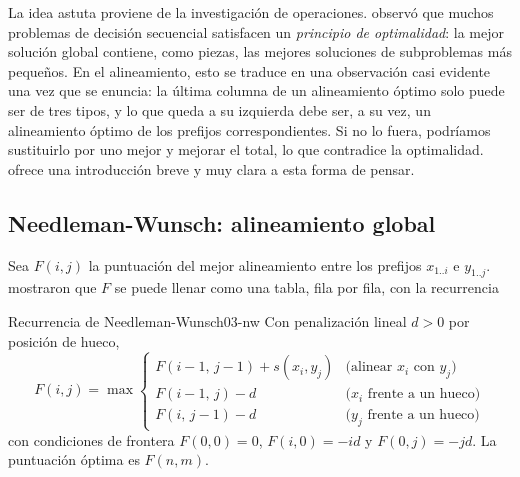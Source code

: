 La idea astuta proviene de la investigación de operaciones. \textcite{c03-bellman1954} observó que muchos problemas de decisión secuencial satisfacen un \emph{principio de optimalidad}: la mejor solución global contiene, como piezas, las mejores soluciones de subproblemas más pequeños. En el alineamiento, esto se traduce en una observación casi evidente una vez que se enuncia: la última columna de un alineamiento óptimo solo puede ser de tres tipos, y lo que queda a su izquierda debe ser, a su vez, un alineamiento óptimo de los prefijos correspondientes. Si no lo fuera, podríamos sustituirlo por uno mejor y mejorar el total, lo que contradice la optimalidad. \textcite{c03-eddy2004dp} ofrece una introducción breve y muy clara a esta forma de pensar.

\subsection{Needleman-Wunsch: alineamiento global}

Sea $F(i,j)$ la puntuación del mejor alineamiento entre los prefijos $x_{1..i}$ e $y_{1..j}$. \textcite{c03-needleman1970} mostraron que $F$ se puede llenar como una tabla, fila por fila, con la recurrencia

\begin{teorema}{Recurrencia de Needleman-Wunsch}{03-nw}
Con penalización lineal $d>0$ por posición de hueco,
\begin{equation}\label{eq:03-nw}
F(i,j) = \max\begin{cases}
F(i-1,\,j-1) + s(x_i, y_j) & \text{(alinear } x_i \text{ con } y_j\text{)}\\[2pt]
F(i-1,\,j) - d & \text{(} x_i \text{ frente a un hueco)}\\[2pt]
F(i,\,j-1) - d & \text{(} y_j \text{ frente a un hueco)}
\end{cases}
\end{equation}
con condiciones de frontera $F(0,0)=0$, $F(i,0)=-id$ y $F(0,j)=-jd$. La puntuación óptima es $F(n,m)$.
\end{teorema}

\begin{simbolos}
\end{simbolos}

